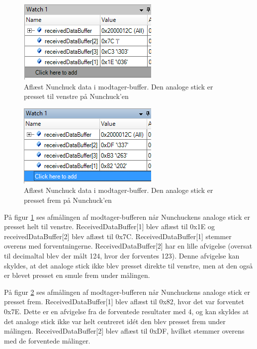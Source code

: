 \begin{figure}[H]
	\centering
	\includegraphics[width=.5\textwidth]{Test/images/I2CProtocolReadLeftAnalog.png}
	\caption{Aflæst Nunchuck data i modtager-buffer. Den analoge stick er presset til venstre på Nunchuck'en}
	\label{fig:I2CProtocolReadLeftAnalog}
\end{figure}

\begin{figure}[H]
	\centering
	\includegraphics[width=.5\textwidth]{Test/images/I2CProtocolReadUpAnalog.png}
	\caption{Aflæst Nunchuck data i modtager-buffer. Den analoge stick er presset frem på Nunchuck'en}
	\label{fig:I2CProtocolReadUpAnalog}
\end{figure}

\noindent På figur \ref{fig:I2CProtocolReadLeftAnalog} ses afmålingen af modtager-bufferen når Nunchuckens analoge stick er presset helt til venstre. ReceivedDataBuffer[1] blev aflæst til 0x1E og receivedDataBuffer[2] blev aflæst til 0x7C. ReceivedDataBuffer[1] stemmer overens med forventningerne. ReceivedDataBuffer[2] har en lille afvigelse (oversat til decimaltal blev der målt 124, hvor der forventes 123). Denne afvigelse kan skyldes, at det analoge stick ikke blev presset direkte til venstre, men at den også er blevet presset en smule frem under målingen. \newline

\noindent På figur \ref{fig:I2CProtocolReadUpAnalog} ses afmålingen af modtager-bufferen når Nunchuckens analoge stick er presset frem. ReceivedDataBuffer[1] blev aflæst til 0x82, hvor det var forventet 0x7E. Dette er en afvigelse fra de forventede resultater med 4, og kan skyldes at det analoge stick ikke var helt centreret idét den blev presset frem under målingen. ReceivedDataBuffer[2] blev aflæst til 0xDF, hvilket stemmer overens med de forventede målinger. \newline

